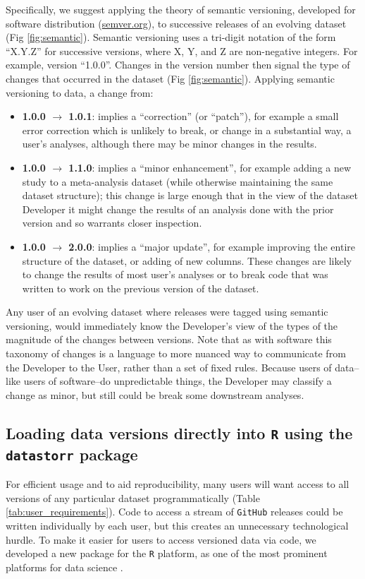 \documentclass[a4paper,num-refs]{assets/oup-contemporary}
\begin{document}
Specifically, we suggest applying the theory of semantic versioning, developed for software distribution (\href{http://semver.org/}{semver.org}), to successive releases of an evolving dataset (Fig \ref{fig:semantic}). Semantic versioning uses a tri-digit notation of the form ``X.Y.Z'' for successive versions, where X, Y, and Z are non-negative integers. For example, version ``1.0.0''. Changes in the version number then signal the type of changes that occurred in the dataset (Fig \ref{fig:semantic}). Applying semantic versioning to data, a change from:
\begin{itemize}
  \item {\bf 1.0.0 $\rightarrow$ 1.0.1}: implies a ``correction'' (or ``patch''), for example a small error correction which is unlikely to break, or change in a substantial way, a user's analyses, although there may be minor changes in the results.
  \item {\bf 1.0.0 $\rightarrow$ 1.1.0}: implies a ``minor enhancement'', for example adding a new study to a meta-analysis dataset (while otherwise maintaining the same dataset structure); this change is large enough that in the view of the dataset Developer it might change the results of an analysis done with the prior version and so warrants closer inspection.
  \item {\bf 1.0.0 $\rightarrow$ 2.0.0}: implies a ``major update'', for example improving the entire structure of the dataset, or adding of new columns. These changes are likely to change the results of most user's analyses or to break code that was written to work on the previous version of the dataset.
\end{itemize}
Any user of an evolving dataset where releases were tagged using semantic versioning, would immediately know the Developer's view of the types of the magnitude of the changes between versions.  Note that as with software this taxonomy of changes is a language to more nuanced way to communicate from the Developer to the User, rather than a set of fixed rules. Because users of data--like users of software--do unpredictable things, the Developer may classify a change as minor, but still could be break some downstream analyses.  

\subsection{Loading data versions directly into \texttt{R} using the \texttt{datastorr} package}

For efficient usage and to aid reproducibility, many users will want access to all versions of any particular dataset programmatically (Table \ref{tab:user_requirements}). Code to access a stream of \texttt{GitHub} releases could be written individually by each user, but this creates an unnecessary technological hurdle. To make it easier for users to access versioned data via code, we developed a new package for the \texttt{R} platform, as one of the most prominent platforms for data science \cite{R-2017}.
\end{document}
